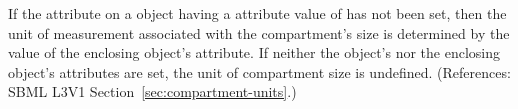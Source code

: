 If the attribute  on a \Compartment object having a
 attribute value of  has not been set, then
the unit of measurement associated with the compartment's size is
determined by the value of the enclosing \Model object's
 attribute.  If neither the \Compartment object's
 nor the enclosing \Model object's 
attributes are set, the unit of compartment size is undefined.
(References: SBML L3V1 Section~\ref{sec:compartment-units}.)
